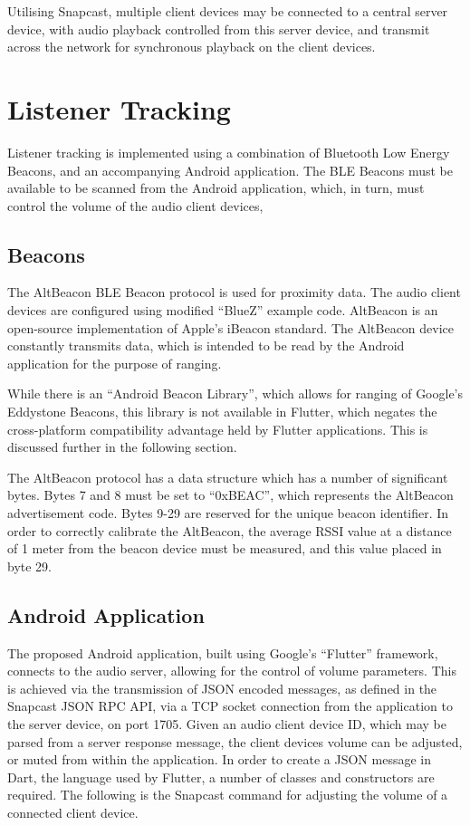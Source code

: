 \documentclass[11pt,a4paper,headinclude=false,footinclude=false]{scrreprt}
\begin{document}
Utilising Snapcast, multiple client devices may be connected to a
central server device, with audio playback controlled from this server
device, and transmit across the network for synchronous playback on the
client devices.

\section{Listener Tracking}\label{listener-tracking-1}

Listener tracking is implemented using a combination of Bluetooth Low
Energy Beacons, and an accompanying Android application. The BLE Beacons
must be available to be scanned from the Android application, which, in
turn, must control the volume of the audio client devices,

\subsection{Beacons}\label{beacons}

The AltBeacon BLE Beacon protocol is used for proximity data. The audio
client devices are configured using modified ``BlueZ'' example
code\cite{RPIAltBeacon}. AltBeacon is an open-source implementation of
Apple's iBeacon standard. The AltBeacon device constantly transmits
data, which is intended to be read by the Android application for the
purpose of ranging.

While there is an ``Android Beacon Library'', which allows for ranging
of Google's Eddystone Beacons\cite{beaconlibrary}, this library is not
available in Flutter, which negates the cross-platform compatibility
advantage held by Flutter applications. This is discussed further in the
following section.

The AltBeacon protocol has a data structure which has a number of
significant bytes. Bytes 7 and 8 must be set to ``0xBEAC'', which
represents the AltBeacon advertisement code\cite{altbeaconprotocol}.
Bytes 9-29 are reserved for the unique beacon identifier. In order to
correctly calibrate the AltBeacon, the average RSSI value at a distance
of 1 meter from the beacon device must be measured, and this value
placed in byte 29.

\subsection{Android Application}\label{android-application}

The proposed Android application, built using Google's ``Flutter''
framework, connects to the audio server, allowing for the control of
volume parameters. This is achieved via the transmission of JSON encoded
messages, as defined in the Snapcast JSON RPC API\cite{snaprpc}, via a
TCP socket connection from the application to the server device, on port
1705. Given an audio client device ID, which may be parsed from a server
response message, the client devices volume can be adjusted, or muted
from within the application. In order to create a JSON message in Dart,
the language used by Flutter, a number of classes and constructors are
required. The following is the Snapcast command for adjusting the volume
of a connected client device.
\end{document}
